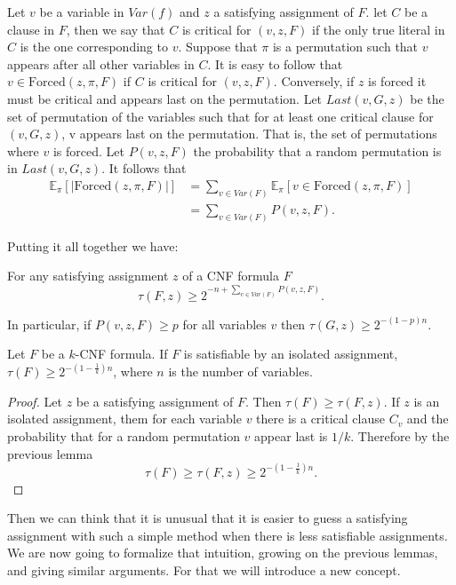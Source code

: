 Let $v$ be a variable in $Var(f)$ and $z$ a satisfying assignment of $F$. let $C$ be a clause in $F$, then we say that $C$ is critical for $(v,z,F)$ if the only true literal in $C$ is the one corresponding to $v$. Suppose that $\pi$ is a permutation such that $v$ appears after all other variables in $C$. It is easy to follow that $v \in \text{Forced}(z,\pi,F)$ if $C$ is critical for $(v,z,F)$. Conversely, if $z$ is forced it must be critical and appears last on the permutation. Let $Last(v,G,z)$ be the set of permutation of the variables such that for at least one critical clause for $(v,G,z)$, v appears last on the permutation. That is, the set of permutations where $v$ is forced. Let $P(v,z,F)$ the probability that a random permutation is in $Last(v,G,z)$. It follows that
\begin{align*}
   \mathbb{E}_{\pi}[|\text{Forced}(z, \pi, F)|] & = \sum_{v \in Var(F)} \mathbb{E}_{\pi}[v \in \text{Forced}( z, \pi, F)]\\ & = \sum_{v \in Var(F)} P(v, z, F) .
\end{align*}


Putting it all together we have:

\begin{lemma}
  \label{labelito}
  For any satisfying assignment $z$ of a CNF formula $F$
  $$\tau(F,z) \ge 2^{-n + \sum_{v \in Var(F)} P(v, z, F)}.$$

  In particular, if $P(v,z,F) \ge p$ for all variables $v$ then $\tau(G,z) \ge 2^{-(1-p)n}$.
\end{lemma}


\begin{theorem}
  Let $F$ be a $k$-CNF formula. If $F$ is satisfiable by an isolated assignment, $\tau(F) \ge 2^{-(1-\frac{1}{k})n}$, where $n$ is the number of variables.
\end{theorem}
\begin{proof}
  Let $z$ be a satisfying assignment of $F$. Then $\tau(F) \ge \tau(F,z)$. If $z$ is an isolated assignment, them for each variable $v$ there is a critical clause $C_v$ and the probability that for a random permutation $v$ appear last is $1/k$. Therefore by the previous lemma  $$\tau(F) \ge \tau(F,z) \ge 2^{-(1-\frac{1}{k})n}.$$
\end{proof}


Then we can think that it is unusual that it is easier to guess a satisfying assignment with such a simple method when there is less satisfiable assignments. We are now going to formalize that intuition, growing on the previous lemmas, and giving similar arguments. For that we will introduce a new concept.

